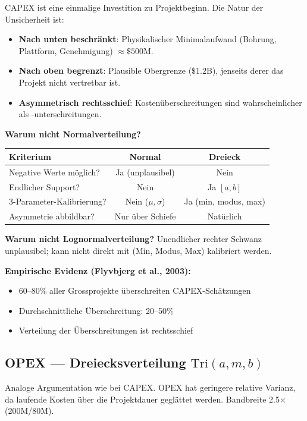 \documentclass[12pt,a4paper]{article}
\begin{document}
CAPEX ist eine einmalige Investition zu Projektbeginn. Die Natur der Unsicherheit ist:

\begin{itemize}
\item \textbf{Nach unten beschränkt}: Physikalischer Minimalaufwand (Bohrung, Plattform, Genehmigung) $\approx \$500$M.
\item \textbf{Nach oben begrenzt}: Plausible Obergrenze ($\$1.2$B), jenseits derer das Projekt nicht vertretbar ist.
\item \textbf{Asymmetrisch rechtsschief}: Kostenüberschreitungen sind wahrscheinlicher als -unterschreitungen.
\end{itemize}

\textbf{Warum nicht Normalverteilung?}

\begin{table}[h]
\centering
\begin{tabular}{lcc}
\toprule
\textbf{Kriterium} & \textbf{Normal} & \textbf{Dreieck} \\
\midrule
Negative Werte möglich? & Ja (unplausibel) & Nein \\
Endlicher Support? & Nein & Ja $[a, b]$ \\
3-Parameter-Kalibrierung? & Nein ($\mu, \sigma$) & Ja (min, modus, max) \\
Asymmetrie abbildbar? & Nur über Schiefe & Natürlich \\
\bottomrule
\end{tabular}
\end{table}

\textbf{Warum nicht Lognormalverteilung?} Unendlicher rechter Schwanz unplausibel; kann nicht direkt mit (Min, Modus, Max) kalibriert werden.

\textbf{Empirische Evidenz (Flyvbjerg et al., 2003):}
\begin{itemize}
\item 60--80\% aller Grossprojekte überschreiten CAPEX-Schätzungen
\item Durchschnittliche Überschreitung: 20--50\%
\item Verteilung der Überschreitungen ist rechtsschief
\end{itemize}

\subsection{OPEX --- Dreiecksverteilung $\text{Tri}(a, m, b)$}

Analoge Argumentation wie bei CAPEX. OPEX hat geringere relative Varianz, da laufende Kosten über die Projektdauer geglättet werden. Bandbreite 2.5$\times$ (200M/80M).
\end{document}
